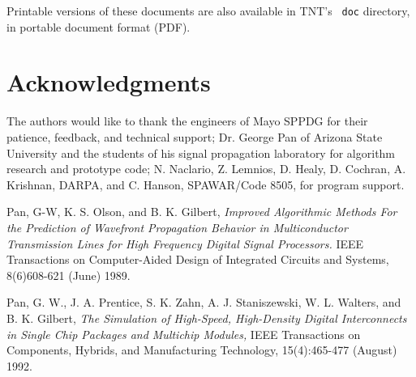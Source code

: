 \documentclass{article}
\begin{document}
Printable versions of these documents are also available in TNT's {\tt
doc} directory, in portable document format (PDF).





\section {Acknowledgments} \label{sec:acknowledgements}

The authors would like to thank the engineers of Mayo SPPDG for their
patience, feedback, and technical support; Dr. George Pan of Arizona
State University and the students of his signal propagation laboratory
for algorithm research and prototype code; N. Naclario, Z. Lemnios,
D. Healy, D. Cochran, A. Krishnan, DARPA, and C. Hanson, SPAWAR/Code
8505, for program support.






\clearpage
\begin{thebibliography}{99}


 Pan, G-W, K. S. Olson, and B. K. Gilbert, {\em
Improved Algorithmic Methods For the Prediction of Wavefront
Propagation Behavior in Multiconductor Transmission Lines for High
Frequency Digital Signal Processors.} IEEE Transactions on
Computer-Aided Design of Integrated Circuits and Systems, 8(6)608-621
(June) 1989.


 Pan, G. W., J. A. Prentice, S. K. Zahn,
A. J. Staniszewski, W. L. Walters, and B. K. Gilbert, {\em The
Simulation of High-Speed, High-Density Digital Interconnects in Single
Chip Packages and Multichip Modules,} IEEE Transactions on Components,
Hybrids, and Manufacturing Technology, 15(4):465-477 (August) 1992.





\end{thebibliography}
\end{document}
